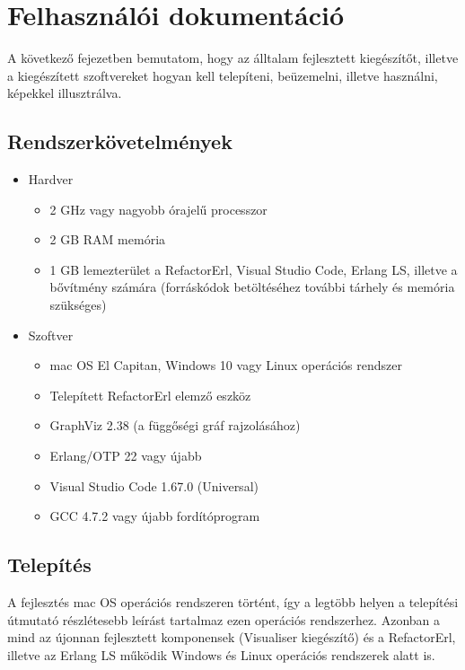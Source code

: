 \chapter{Felhasználói dokumentáció}
\label{ch:user}

A következő fejezetben bemutatom, hogy az álltalam fejlesztett kiegészítőt, illetve a kiegészített szoftvereket hogyan kell telepíteni, beüzemelni, illetve használni, képekkel illusztrálva.

\section{Rendszerkövetelmények}

\begin{itemize}
    \item Hardver
    \begin{itemize}
        \item 2 GHz vagy nagyobb órajelű processzor
        \item 2 GB RAM memória
        \item 1 GB lemezterület a RefactorErl, Visual Studio Code, Erlang LS, illetve a bővítmény számára (forráskódok betöltéséhez további tárhely és memória szükséges)
    \end{itemize}
    \item Szoftver
    \begin{itemize}
        \item mac OS El Capitan, Windows 10 vagy Linux operációs rendszer
        \item Telepített RefactorErl elemző eszköz
        \item GraphViz 2.38 (a függőségi gráf rajzolásához)
        \item Erlang/OTP 22 vagy újabb
        \item Visual Studio Code 1.67.0 (Universal)
        \item GCC 4.7.2 vagy újabb fordítóprogram
    \end{itemize}
\end{itemize}

\section{Telepítés}

A fejlesztés mac OS operációs rendszeren történt, így a legtöbb helyen a telepítési útmutató részlétesebb leírást tartalmaz ezen operációs rendszerhez. Azonban a mind az újonnan fejlesztett komponensek (Visualiser kiegészítő) és a RefactorErl, illetve az Erlang LS működik Windows és Linux operációs rendszerek alatt is.

